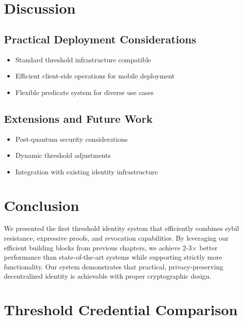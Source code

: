 \section{Discussion}
\label{sec:threshold-discussion}

\subsection{Practical Deployment Considerations}
\begin{itemize}
    \item Standard threshold infrastructure compatible
    \item Efficient client-side operations for mobile deployment
    \item Flexible predicate system for diverse use cases
\end{itemize}

\subsection{Extensions and Future Work}
\begin{itemize}
    \item Post-quantum security considerations
    \item Dynamic threshold adjustments
    \item Integration with existing identity infrastructure
\end{itemize}

\section{Conclusion}
\label{sec:threshold-conclusion}

We presented the first threshold identity system that efficiently combines sybil resistance, expressive proofs, and revocation capabilities. By leveraging our efficient building blocks from previous chapters, we achieve 2-3× better performance than state-of-the-art systems while supporting strictly more functionality. Our system demonstrates that practical, privacy-preserving decentralized identity is achievable with proper cryptographic design.







\section{Threshold Credential Comparison}

